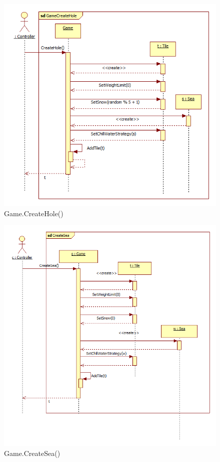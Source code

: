 \begin{figure}[H]
	\begin{center}
		\includegraphics[width=15cm]{chapters/chapter04/seqdiag/Game_CreateHole.png}
		\caption{Game.CreateHole()}
		\label{fig:GameCreateHole}
	\end{center}
\end{figure}
\begin{figure}[H]
	\begin{center}
		\includegraphics[width=13cm]{chapters/chapter04/seqdiag/Game_CreateSea.png}
		\caption{Game.CreateSea()}
		\label{fig:GameCreateSea}
	\end{center}
\end{figure}
